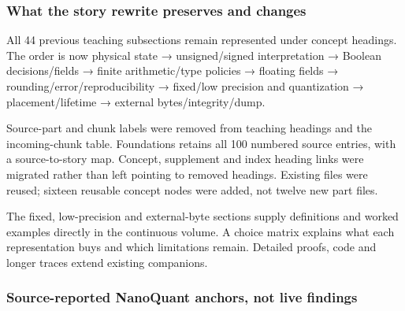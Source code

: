 \subsubsection{What the story rewrite preserves and changes}\label{appendix-a103e7846d21-what-the-story-rewrite-preserves-and-changes}

\hypertarget{appendix-a103e7846d21-what-the-story-rewrite-preserves-and-changes}{}

All 44 previous teaching subsections remain represented under concept headings. The order is now physical state → unsigned/signed interpretation → Boolean decisions/fields → finite arithmetic/type policies → floating fields → rounding/error/reproducibility → fixed/low precision and quantization → placement/lifetime → external bytes/integrity/dump.

Source-part and chunk labels were removed from teaching headings and the incoming-chunk table. Foundations retains all 100 numbered source entries, with a source-to-story map. Concept, supplement and index heading links were migrated rather than left pointing to removed headings. Existing files were reused; sixteen reusable concept nodes were added, not twelve new part files.

The fixed, low-precision and external-byte sections supply definitions and worked examples directly in the continuous volume. A choice matrix explains what each representation buys and which limitations remain. Detailed proofs, code and longer traces extend existing companions.

\subsubsection{Source-reported NanoQuant anchors, not live findings}\label{appendix-a103e7846d21-source-reported-nanoquant-anchors-not-live-findings}

\hypertarget{appendix-a103e7846d21-source-reported-nanoquant-anchors-not-live-findings}{}

